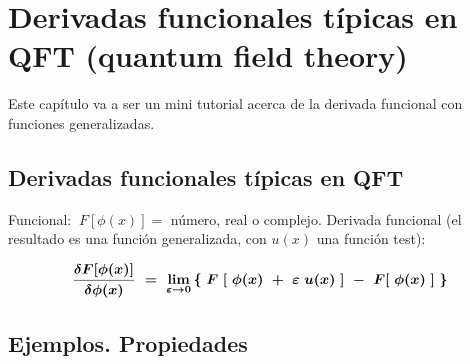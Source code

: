 \chapter{Derivadas funcionales típicas en QFT \tiny{(quantum field theory)}}


\vspace{10mm}
\begin{adjustwidth}{50pt}{50pt}
\begin{ejemplo}
\vspace{2mm}
Este capítulo va a ser un mini tutorial acerca de la derivada funcional con funciones generalizadas.
\vspace{2mm}

\end{ejemplo}
\end{adjustwidth}

\vspace{5mm}

\section{Derivadas funcionales típicas en QFT}

\begin{definition}
	
	Funcional: $\ F[\phi(x)] = $ número, real o complejo. Derivada funcional (el resultado es una función generalizada, con $u(x)$ una función test):
	
	\vspace{3mm}
	\begin{large}
	\begin{equation}
	\label{T37DF}
	\boldsymbol{
	\fdv{F[\phi(x)]}{\phi(x)} \ = \ \lim_{\varepsilon \to 0} \left\{  \ F \ [ \ \phi(x)\ + \ \varepsilon \ u(x)   \ ] \ - \ F[ \ \phi(x) \ ] \ \right\}
	}	
	\end{equation}
	\end{large}
\end{definition}

\vspace{5mm}
\section{Ejemplos. Propiedades}





